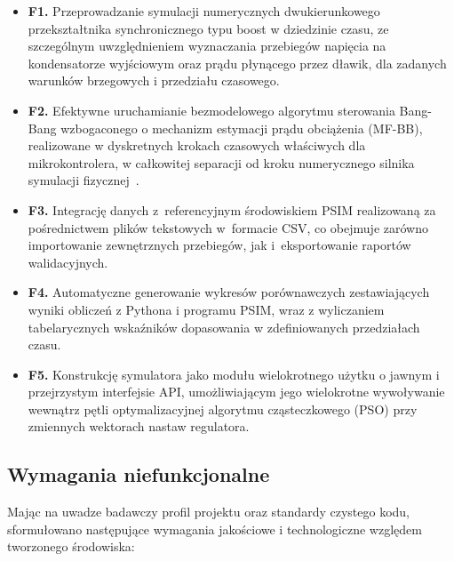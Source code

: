 \begin{itemize}
    \item \textbf{F1.} Przeprowadzanie symulacji numerycznych dwukierunkowego przekształtnika synchronicznego typu boost w dziedzinie czasu, ze szczególnym uwzględnieniem wyznaczania przebiegów napięcia na kondensatorze wyjściowym oraz prądu płynącego przez dławik, dla zadanych warunków brzegowych i przedziału czasowego.
    \item \textbf{F2.} Efektywne uruchamianie bezmodelowego algorytmu sterowania Bang-Bang wzbogaconego o mechanizm estymacji prądu obciążenia (MF-BB), realizowane w dyskretnych krokach czasowych właściwych dla mikrokontrolera, w całkowitej separacji od kroku numerycznego silnika symulacji fizycznej~\cite{tatari2024mfbb}.
    \item \textbf{F3.} Integrację danych z~referencyjnym środowiskiem PSIM realizowaną za pośrednictwem plików tekstowych w~formacie CSV, co obejmuje zarówno importowanie zewnętrznych przebiegów, jak i~eksportowanie raportów walidacyjnych.
    \item \textbf{F4.} Automatyczne generowanie wykresów porównawczych zestawiających wyniki obliczeń z Pythona i programu PSIM, wraz z wyliczaniem tabelarycznych wskaźników dopasowania w zdefiniowanych przedziałach czasu.
    \item \textbf{F5.} Konstrukcję symulatora jako modułu wielokrotnego użytku o jawnym i przejrzystym interfejsie API, umożliwiającym jego wielokrotne wywoływanie wewnątrz pętli optymalizacyjnej algorytmu cząsteczkowego (PSO) przy zmiennych wektorach nastaw regulatora.
\end{itemize}

\subsection{Wymagania niefunkcjonalne}
\label{subsec:wym-niefunkcjonalne}

Mając na uwadze badawczy profil projektu oraz standardy czystego kodu, sformułowano następujące wymagania jakościowe i technologiczne względem tworzonego środowiska:


